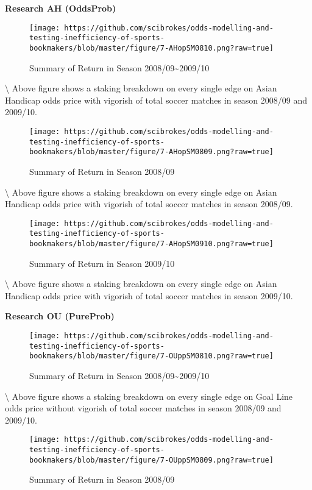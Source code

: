 \documentclass[article]{jss}
\begin{document}
\textbf{Research AH (OddsProb)} \bigbreak

\begin{figure}[htbp]
\centering
\texttt{[image: https://github.com/scibrokes/odds-modelling-and-testing-inefficiency-of-sports-bookmakers/blob/master/figure/7-AHopSM0810.png?raw=true]}
\caption{Summary of Return in Season 2008/09\textasciitilde{}2009/10}
\end{figure}

\textbackslash{} Above figure shows a staking breakdown on every single
edge on Asian Handicap odds price with vigorish of total soccer matches
in season 2008/09 and 2009/10.

\begin{figure}[htbp]
\centering
\texttt{[image: https://github.com/scibrokes/odds-modelling-and-testing-inefficiency-of-sports-bookmakers/blob/master/figure/7-AHopSM0809.png?raw=true]}
\caption{Summary of Return in Season 2008/09}
\end{figure}

\textbackslash{} Above figure shows a staking breakdown on every single
edge on Asian Handicap odds price with vigorish of total soccer matches
in season 2008/09.

\begin{figure}[htbp]
\centering
\texttt{[image: https://github.com/scibrokes/odds-modelling-and-testing-inefficiency-of-sports-bookmakers/blob/master/figure/7-AHopSM0910.png?raw=true]}
\caption{Summary of Return in Season 2009/10}
\end{figure}

\textbackslash{} Above figure shows a staking breakdown on every single
edge on Asian Handicap odds price with vigorish of total soccer matches
in season 2009/10. \bigbreak

\textbf{Research OU (PureProb)} \bigbreak

\begin{figure}[htbp]
\centering
\texttt{[image: https://github.com/scibrokes/odds-modelling-and-testing-inefficiency-of-sports-bookmakers/blob/master/figure/7-OUppSM0810.png?raw=true]}
\caption{Summary of Return in Season 2008/09\textasciitilde{}2009/10}
\end{figure}

\textbackslash{} Above figure shows a staking breakdown on every single
edge on Goal Line odds price without vigorish of total soccer matches in
season 2008/09 and 2009/10.

\begin{figure}[htbp]
\centering
\texttt{[image: https://github.com/scibrokes/odds-modelling-and-testing-inefficiency-of-sports-bookmakers/blob/master/figure/7-OUppSM0809.png?raw=true]}
\caption{Summary of Return in Season 2008/09}
\end{figure}
\end{document}
